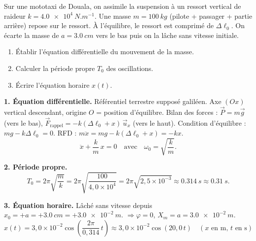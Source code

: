 \documentclass[11pt]{article}
\begin{document}
\begin{exoresolu}
Sur une mototaxi de Douala, on assimile la suspension à un ressort vertical de raideur $k = \SI{4,0e4}{N.m^{-1}}$. Une masse $m = \SI{100}{kg}$ (pilote + passager + partie arrière) repose sur le ressort. À l'équilibre, le ressort est comprimé de $\Delta\ell_0$. On écarte la masse de $a = \SI{3,0}{cm}$ vers le bas puis on la lâche sans vitesse initiale.
\begin{enumerate}
\item Établir l'équation différentielle du mouvement de la masse.
\item Calculer la période propre $T_0$ des oscillations.
\item Écrire l'équation horaire $x(t)$.
\end{enumerate}
\tcblower
\textbf{1. Équation différentielle.}
Référentiel terrestre supposé galiléen. Axe $(Ox)$ vertical descendant, origine $O$ = position d'équilibre.
Bilan des forces : $\vec{P} = m\vec{g}$ (vers le bas), $\vec{F}_{\text{rappel}} = -k(\Delta\ell_0 + x)\,\vec{u}_x$ (vers le haut).
Condition d'équilibre : $mg - k\Delta\ell_0 = 0$.
RFD : $m\ddot{x} = mg - k(\Delta\ell_0 + x) = -kx$.
\[ \boxed{\ddot{x} + \frac{k}{m}\,x = 0} \quad\text{avec}\quad \omega_0 = \sqrt{\frac{k}{m}}. \]

\textbf{2. Période propre.}
\[ T_0 = 2\pi\sqrt{\frac{m}{k}} = 2\pi\sqrt{\frac{100}{4{,}0\times 10^{4}}} = 2\pi\sqrt{2{,}5\times 10^{-3}} \approx \SI{0,314}{s} \approx \SI{0,31}{s}. \]

\textbf{3. Équation horaire.}
Lâché sans vitesse depuis $x_0 = +a = +\SI{3,0}{cm} = +\SI{3,0e-2}{m}$.
$\Rightarrow \varphi = 0$, $X_m = a = \SI{3,0e-2}{m}$.
\[ \boxed{x(t) = 3{,}0\times 10^{-2}\cos\left(\frac{2\pi}{0{,}314}\,t\right) \approx 3{,}0\times 10^{-2}\cos(20{,}0\,t) \quad (x \text{ en m},\, t \text{ en s})} \]
\end{exoresolu}
\end{document}
